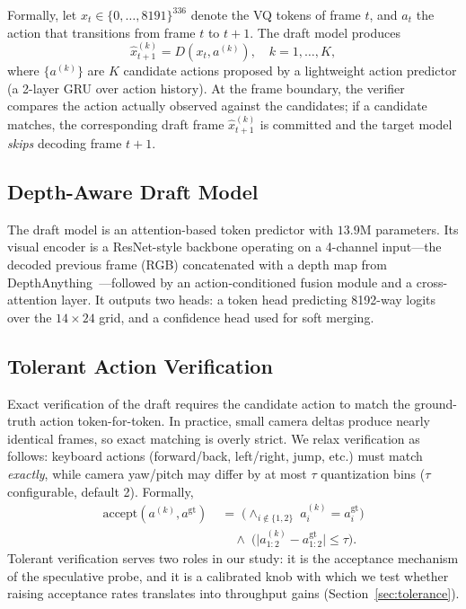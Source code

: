 \documentclass[10pt, twocolumn]{article}
\begin{document}
Formally, let $x_t \in \{0,\ldots,8191\}^{336}$ denote the VQ tokens of frame $t$, and $a_t$ the action that transitions from frame $t$ to $t{+}1$. The draft model produces
\begin{equation}
  \hat x_{t+1}^{(k)} = D(x_t, a^{(k)}), \quad k=1,\ldots,K,
\end{equation}
where $\{a^{(k)}\}$ are $K$ candidate actions proposed by a lightweight action predictor (a 2-layer GRU over action history). At the frame boundary, the verifier compares the action actually observed against the candidates; if a candidate matches, the corresponding draft frame $\hat x_{t+1}^{(k)}$ is committed and the target model \emph{skips} decoding frame $t{+}1$.

\subsection{Depth-Aware Draft Model}
The draft model is an attention-based token predictor with $13.9$M parameters. Its visual encoder is a ResNet-style backbone operating on a 4-channel input---the decoded previous frame (RGB) concatenated with a depth map from DepthAnything~\cite{depthanything}---followed by an action-conditioned fusion module and a cross-attention layer. It outputs two heads: a token head predicting 8192-way logits over the $14\times24$ grid, and a confidence head used for soft merging.

\subsection{Tolerant Action Verification}
Exact verification of the draft requires the candidate action to match the ground-truth action token-for-token. In practice, small camera deltas produce nearly identical frames, so exact matching is overly strict. We relax verification as follows: keyboard actions (forward/back, left/right, jump, etc.) must match \emph{exactly}, while camera yaw/pitch may differ by at most $\tau$ quantization bins ($\tau$ configurable, default 2). Formally,
\begin{equation}
\begin{split}
  \mathrm{accept}(a^{(k)}, a^{\mathrm{gt}}) \;&=\;
  \Big(\wedge_{i \notin \{1,2\}}\; a^{(k)}_i = a^{\mathrm{gt}}_i\Big) \\
  &\quad\wedge\; \Big(\big|a^{(k)}_{1:2} - a^{\mathrm{gt}}_{1:2}\big| \le \tau\Big).
\end{split}
\end{equation}
Tolerant verification serves two roles in our study: it is the acceptance mechanism of the speculative probe, and it is a calibrated knob with which we test whether raising acceptance rates translates into throughput gains (Section~\ref{sec:tolerance}).
\end{document}
